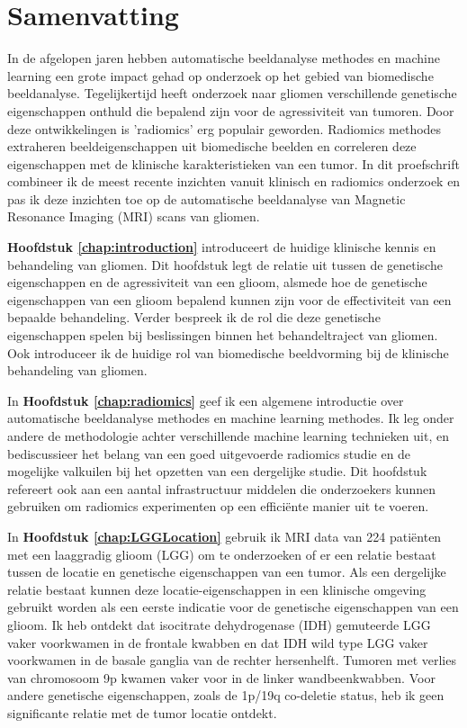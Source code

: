 \chapter{Samenvatting}
\begin{ChapterAbstractNoTitle}
\end{ChapterAbstractNoTitle}

In de afgelopen jaren hebben automatische beeldanalyse methodes en machine learning een grote impact gehad op onderzoek op het gebied van biomedische beeld\-analyse.
Tegelijkertijd heeft onderzoek naar gliomen verschillende genetische eigenschappen onthuld die bepalend zijn voor de agressiviteit van tumoren.
Door deze ontwikkelingen is 'radiomics' erg populair geworden.
Radiomics methodes extraheren beeldeigenschappen uit biomedische beelden en correleren deze eigenschappen met de klinische karakteristieken van een tumor.
In dit proefschrift combineer ik de meest recente inzichten vanuit klinisch en radiomics onderzoek en pas ik deze inzichten toe op de automatische beeldanalyse van Magnetic Resonance Imaging (MRI) scans van gliomen.


\textbf{Hoofdstuk \ref{chap:introduction}} introduceert de huidige klinische kennis en behandeling van gliomen.
Dit hoofdstuk legt de relatie uit tussen de genetische eigenschappen en de agressiviteit van een glioom, alsmede hoe de genetische eigenschappen van een glioom bepalend kunnen zijn voor de effectiviteit van een bepaalde behandeling.
Verder bespreek ik de rol die deze genetische eigenschappen spelen bij beslissingen binnen het behandeltraject van gliomen.
Ook introduceer ik de huidige rol van biomedische beeldvorming bij de klinische behandeling van gliomen.

In \textbf{Hoofdstuk \ref{chap:radiomics}} geef ik een algemene introductie over automatische beeldanalyse methodes en machine learning methodes.
Ik leg onder andere de methodologie achter verschillende machine learning technieken uit, en bediscussieer het belang van een goed uitgevoerde radiomics studie en de mogelijke valkuilen bij het opzetten van een dergelijke studie.
Dit hoofdstuk refereert ook aan een aantal infrastructuur middelen die onderzoekers kunnen gebruiken om radiomics experimenten op een effici{\"e}nte manier uit te voeren.

In \textbf{Hoofdstuk \ref{chap:LGGLocation}} gebruik ik MRI data van 224 pati{\"e}nten met een  laaggradig glioom (LGG) om te onderzoeken of er een relatie bestaat tussen de locatie en genetische eigenschappen van een tumor.
Als een dergelijke relatie bestaat kunnen deze locatie-eigenschappen in een klinische omgeving gebruikt worden als een eerste indicatie voor de genetische eigenschappen van een glioom.
Ik heb ontdekt dat isocitrate dehydrogenase (IDH) gemuteerde LGG vaker voorkwamen in de frontale kwabben en dat IDH wild type LGG vaker voorkwamen in de basale ganglia van de rechter hersenhelft.
Tumoren met verlies van chromosoom 9p kwamen vaker voor in de linker wandbeenkwabben.
Voor andere genetische eigenschappen, zoals de 1p/19q co-deletie status, heb ik geen significante relatie met de tumor locatie ontdekt.


